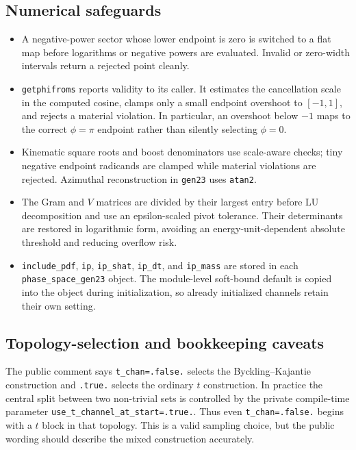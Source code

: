 \documentclass[11pt,a4paper]{article}
\newcommand{\code}[1]{\texttt{#1}}
\begin{document}
\subsection{Numerical safeguards}

\begin{itemize}
\item A negative-power sector whose lower endpoint is zero is switched to a
  flat map before logarithms or negative powers are evaluated.  Invalid or
  zero-width intervals return a rejected point cleanly.
\item \code{getphifroms} reports validity to its caller.  It estimates the
  cancellation scale in the computed cosine, clamps only a small endpoint
  overshoot to $[-1,1]$, and rejects a material violation.  In particular, an
  overshoot below $-1$ maps to the correct $\phi=\pi$ endpoint rather than
  silently selecting $\phi=0$.
\item Kinematic square roots and boost denominators use scale-aware checks;
  tiny negative endpoint radicands are clamped while material violations are
  rejected.  Azimuthal reconstruction in \code{gen23} uses \code{atan2}.
\item The Gram and $V$ matrices are divided by their largest entry before LU
  decomposition and use an epsilon-scaled pivot tolerance.  Their determinants
  are restored in logarithmic form, avoiding an energy-unit-dependent absolute
  threshold and reducing overflow risk.
\item \code{include\_pdf}, \code{ip}, \code{ip\_shat}, \code{ip\_dt}, and
  \code{ip\_mass} are stored in each \code{phase\_space\_gen23} object.  The
  module-level soft-bound default is copied into the object during
  initialization, so already initialized channels retain their own setting.
\end{itemize}

\subsection{Topology-selection and bookkeeping caveats}

The public comment says \code{t\_chan=.false.} selects the Byckling--Kajantie
construction and \code{.true.} selects the ordinary $t$ construction.  In
practice the central split between two non-trivial sets is controlled by the
private compile-time parameter \code{use\_t\_channel\_at\_start=.true.}.
Thus even \code{t\_chan=.false.} begins with a $t$ block in that topology.
This is a valid sampling choice, but the public wording should describe the
mixed construction accurately.
\end{document}
